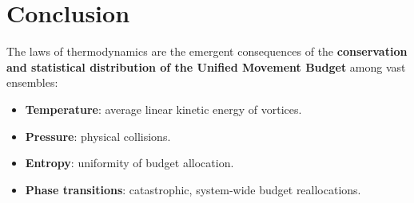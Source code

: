 \section{Conclusion}

The laws of thermodynamics are the emergent consequences of the \textbf{conservation and statistical distribution of the Unified Movement Budget} among vast ensembles:
\begin{itemize}
  \item \textbf{Temperature}: average linear kinetic energy of vortices.
  \item \textbf{Pressure}: physical collisions.
  \item \textbf{Entropy}: uniformity of budget allocation.
  \item \textbf{Phase transitions}: catastrophic, system-wide budget reallocations.
\end{itemize}
